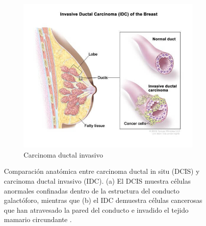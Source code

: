 \documentclass[a4paper,10pt]{book}
\begin{document}
\begin{figure}[h!]
\begin{subfigure}[c]{0.48\textwidth}
		\includegraphics[width=\textwidth]{reports/assets/idc.jpg}
		\caption{Carcinoma ductal invasivo}
		\label{fig:idc}
	\end{subfigure}
	\caption[Comparación DCIS vs. IDC]{Comparación anatómica entre carcinoma ductal in situ (DCIS) y carcinoma ductal invasivo (IDC). (a) El DCIS muestra células anormales confinadas dentro de la estructura del conducto galactóforo, mientras que (b) el IDC demuestra células cancerosas que han atravesado la pared del conducto e invadido el tejido mamario circundante \cite{noauthor_nci_2011}.}
	\label{fig:histological_types_one}
\end{figure}
\end{document}
